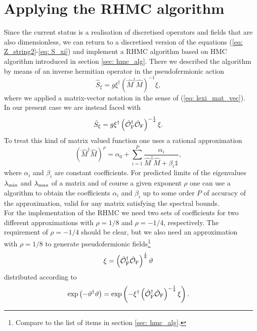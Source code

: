 \section{Applying the RHMC algorithm}
Since the current status is a realisation of discretised operators and fields that are also dimensionless, we can return to a discretised version of the equations (\ref{eq: Z_string2}-\ref{eq: S_xi}) and implement a RHMC algorithm based on HMC algorithm introduced in section \ref{sec: hmc_alg}. There we described the algorithm by means of an inverse hermitian operator in the pseudofermionic action
%
%
\begin{equation}
\hat{S}_{\xi} = g \xi^{\dagger}\left(\hat{M}^{\dagger}\hat{M}\right)^{-1}\xi,
\end{equation}
%
%
where we applied a matrix-vector notation in the sense of (\ref{eq: lexi_mat_vec}). In our present case we are instead faced with
%
%
\begin{equation}
\hat{S}_{\xi} = g \xi^{\dagger}\left(\hat{\mathcal{O}}_{\rm F}^{\dagger}\hat{\mathcal{O}}_{\rm F}\right)^{-\frac{1}{4}} \xi.
\end{equation}
%
%
To treat this kind of matrix valued function one uses a rational approximation
%
%
\begin{equation}
\left(\hat{M}^{\dagger}\hat{M}\right)^{\rho	} = \alpha_{0} + \sum\limits_{i=1}^{P} \frac{\alpha_{i}}{\hat{M}^{\dagger}\hat{M}+\beta_{i}\mathds{1}},
\label{eq: rat_approx}
\end{equation}
%
%
where $\alpha_{i}$ and $\beta_{i}$ are constant coefficients. For predicted limits of the eigenvalues $\lambda_{\rm min}$ and $\lambda_{\rm max}$ of a matrix and of course a given exponent $\rho$ one can use a  algorithm to obtain the coefficients $\alpha_{i}$ and $\beta_{i}$ up to some order $P$ of accuracy of the approximation, valid for any matrix satisfying the spectral bounds.\\
For the implementation of the RHMC we need two sets of coefficients for two different approximations with $\rho=1/8$ and $\rho=-1/4$, respectively. The requirement of $\rho=-1/4$ should be clear, but we also need an approximation with $\rho=1/8$ to generate pseudofermionic fields\footnote{Compare to the list of items in section \ref{sec: hmc_alg}.} 
%
%
\begin{equation}
\xi = \left(\hat{\mathcal{O}}_{\rm F}^{\dagger}\hat{\mathcal{O}}_{\rm F}\right)^{\frac{1}{8}} \vartheta
\end{equation}
%
%
distributed according to
%
%
\begin{equation}
\exp\left(-\vartheta^{\dagger}\vartheta\right) = \exp\left( -\xi^{\dagger}\left(\hat{\mathcal{O}}_{\rm F}^{\dagger}\hat{\mathcal{O}}_{\rm F}\right)^{-\frac{1}{4}} \xi \right).
\end{equation}
